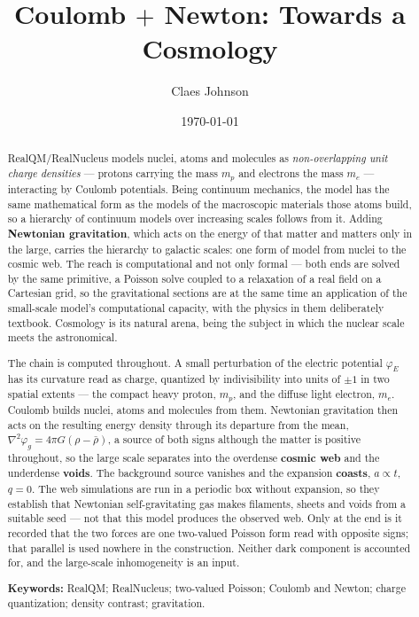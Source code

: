 \documentclass[11pt]{article}
\title{\textbf{Coulomb $+$ Newton: Towards a Cosmology}}
\author[1]{Claes Johnson}
\affil[1]{KTH Royal Institute of Technology, Stockholm, Sweden \\ \texttt{claesjohnson@gmail.com}}
\date{\today}
\newcommand{\grad}{\nabla}
\begin{document}
\maketitle

\begin{abstract}
\noindent RealQM/RealNucleus models nuclei, atoms and molecules as \emph{non-overlapping unit charge densities} ---
protons carrying the mass $m_p$ and electrons the mass $m_e$ --- interacting by Coulomb potentials. Being continuum
mechanics, the model has the same mathematical form as the models of the macroscopic materials those atoms build,
so a hierarchy of continuum models over increasing scales follows from it. Adding \textbf{Newtonian gravitation},
which acts on the energy of that matter and matters only in the large, carries the hierarchy to galactic scales:
one form of model from nuclei to the cosmic web. The reach is computational and not only formal --- both ends are
solved by the same primitive, a Poisson solve coupled to a relaxation of a real field on a Cartesian grid, so the
gravitational sections are at the same time an application of the small-scale model's computational capacity, with
the physics in them deliberately textbook. Cosmology is its natural arena, being the subject in which the nuclear
scale meets the astronomical.

\medskip
\noindent The chain is computed throughout. A small perturbation of the electric potential $\varphi_E$ has its
curvature read as charge, quantized by indivisibility into units of $\pm1$ in two spatial extents --- the compact
heavy proton, $m_p$, and the diffuse light electron, $m_e$. Coulomb builds nuclei, atoms and molecules from them.
Newtonian gravitation then acts on the resulting energy density through its departure from the mean,
$\grad^2\varphi_g=4\pi G(\rho-\bar\rho)$, a source of both signs although the matter is positive throughout, so the
large scale separates into the overdense \textbf{cosmic web} and the underdense \textbf{voids}. The background
source vanishes and the expansion \textbf{coasts}, $a\propto t$, $q=0$. The web simulations are run in a periodic box without expansion, so
they establish that Newtonian self-gravitating gas makes filaments, sheets and voids from a suitable seed --- not
that this model produces the observed web. Only at the end is it recorded that the two forces are one two-valued
Poisson form read with opposite signs; that parallel is used nowhere in the construction. Neither dark component is accounted for, and the large-scale inhomogeneity is an input.

\medskip
\noindent\textbf{Keywords:} RealQM; RealNucleus; two-valued Poisson; Coulomb and Newton; charge quantization;
density contrast; gravitation.
\end{abstract}
\end{document}
